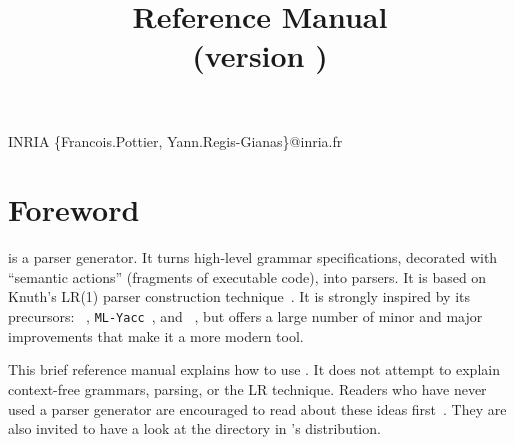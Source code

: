 \documentclass[onecolumn,11pt,nocopyrightspace,preprint]{sigplanconf}
\title{\menhir Reference Manual\\\normalsize (version \menhirversion)}
\begin{document}
	   {INRIA}
	   {\{Francois.Pottier, Yann.Regis-Gianas\}@inria.fr}

\maketitle


\clearpage
\tableofcontents
\clearpage


\section{Foreword}

\menhir is a parser generator. It turns high-level grammar specifications,
decorated with ``semantic actions'' (fragments of executable code), into
parsers. It is based on Knuth's LR(1) parser construction
technique~\cite{knuth-lr-65}. It is strongly inspired by its precursors:
\yacc~\cite{johnson-yacc-79}, \texttt{ML-Yacc}~\cite{tarditi-appel-00}, and
\ocamlyacc~\cite{ocaml}, but offers a large number of minor and major
improvements that make it a more modern tool.

This brief reference manual explains how to use \menhir. It does not attempt to
explain context-free grammars, parsing, or the LR technique. Readers who have
never used a parser generator are encouraged to read about these ideas
first~\cite{aho-86,appel-tiger-98,hopcroft-motwani-ullman-00}. They are also
invited to have a look at the  directory in \menhir's
distribution.
\end{document}
